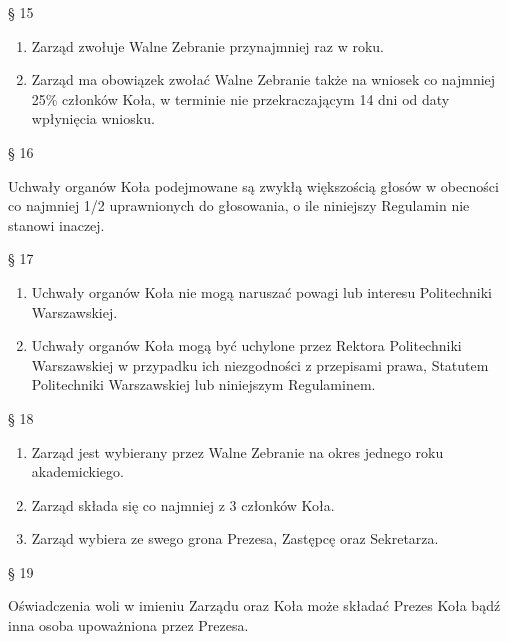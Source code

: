 \documentclass[a4paper,11pt]{article}
\renewcommand{\paragraph}[1] {\begin{center}§ {#1}\end{center}}
\newcommand{\content}[1] {\begin{flushleft}{#1}\end{flushleft}}
\begin{document}
\paragraph{15}
\begin{enumerate}
	\item Zarząd zwołuje Walne Zebranie przynajmniej raz w roku.
	\item Zarząd ma obowiązek zwołać Walne Zebranie także na wniosek co najmniej  25\% członków 
Koła, w terminie nie przekraczającym 14 dni od daty wpłynięcia wniosku.
\end{enumerate}

\paragraph{16}
\content{Uchwały organów Koła podejmowane są zwykłą większością głosów w obecności co najmniej 1/2 uprawnionych do głosowania, o ile niniejszy Regulamin nie stanowi inaczej.}

\paragraph{17}
\begin{enumerate}
	\item Uchwały organów Koła nie mogą  naruszać powagi lub interesu Politechniki Warszawskiej.
	\item Uchwały organów Koła mogą być uchylone przez Rektora Politechniki Warszawskiej w
przypadku ich niezgodności z przepisami prawa, Statutem Politechniki Warszawskiej lub
niniejszym Regulaminem.
\end{enumerate}

\paragraph{18}
\begin{enumerate}
	\item Zarząd jest wybierany przez Walne Zebranie na okres jednego roku akademickiego.
	\item Zarząd składa się co najmniej z 3 członków Koła.
	\item Zarząd wybiera ze swego grona Prezesa, Zastępcę oraz Sekretarza.
\end{enumerate}

\paragraph{19}
\content{Oświadczenia woli w imieniu Zarządu oraz Koła może składać Prezes Koła bądź inna osoba
upoważniona przez Prezesa.}
\end{document}

